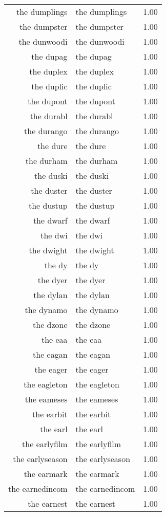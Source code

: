 \begin{table}[ht]
\begin{tabular}{rlr}
  the dumplings & the dumplings & 1.00 \\ 
  the dumpster & the dumpster & 1.00 \\ 
  the dunwoodi & the dunwoodi & 1.00 \\ 
  the dupag & the dupag & 1.00 \\ 
  the duplex & the duplex & 1.00 \\ 
  the duplic & the duplic & 1.00 \\ 
  the dupont & the dupont & 1.00 \\ 
  the durabl & the durabl & 1.00 \\ 
  the durango & the durango & 1.00 \\ 
  the dure & the dure & 1.00 \\ 
  the durham & the durham & 1.00 \\ 
  the duski & the duski & 1.00 \\ 
  the duster & the duster & 1.00 \\ 
  the dustup & the dustup & 1.00 \\ 
  the dwarf & the dwarf & 1.00 \\ 
  the dwi & the dwi & 1.00 \\ 
  the dwight & the dwight & 1.00 \\ 
  the dy & the dy & 1.00 \\ 
  the dyer & the dyer & 1.00 \\ 
  the dylan & the dylan & 1.00 \\ 
  the dynamo & the dynamo & 1.00 \\ 
  the dzone & the dzone & 1.00 \\ 
  the eaa & the eaa & 1.00 \\ 
  the eagan & the eagan & 1.00 \\ 
  the eager & the eager & 1.00 \\ 
  the eagleton & the eagleton & 1.00 \\ 
  the eameses & the eameses & 1.00 \\ 
  the earbit & the earbit & 1.00 \\ 
  the earl & the earl & 1.00 \\ 
  the earlyfilm & the earlyfilm & 1.00 \\ 
  the earlyseason & the earlyseason & 1.00 \\ 
  the earmark & the earmark & 1.00 \\ 
  the earnedincom & the earnedincom & 1.00 \\ 
  the earnest & the earnest & 1.00 \\ 

\end{tabular}
\end{table}
